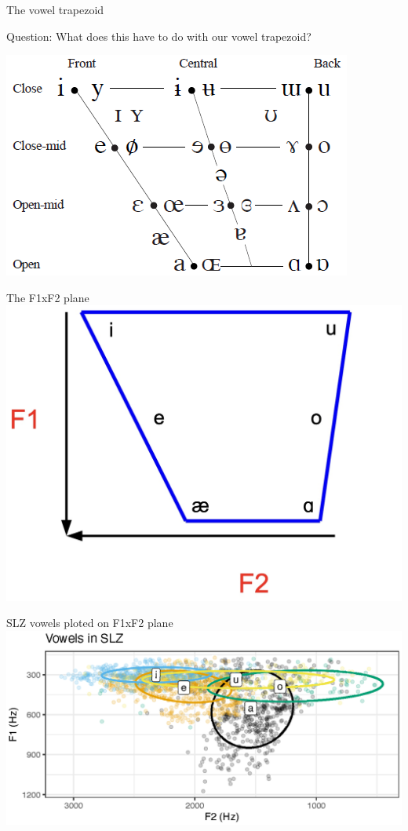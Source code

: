 \documentclass[professionalfonts]{beamer}
\begin{document}
\begin{frame}{The vowel trapezoid}
    \begin{block}{Question:}
        What does this have to do with our vowel trapezoid?
    \end{block}
    \begin{center}
        \includegraphics[width=0.75\linewidth]{figs/IPAVowels.png}
    \end{center}
\end{frame}

\begin{frame}{The F1xF2 plane}
    \includegraphics[width = \linewidth]{figs/F1xF2.jpg}
\end{frame}

\begin{frame}{SLZ vowels ploted on F1xF2 plane}
    \includegraphics[width = \linewidth]{figs/slz_vowels.eps}
\end{frame}
\end{document}

